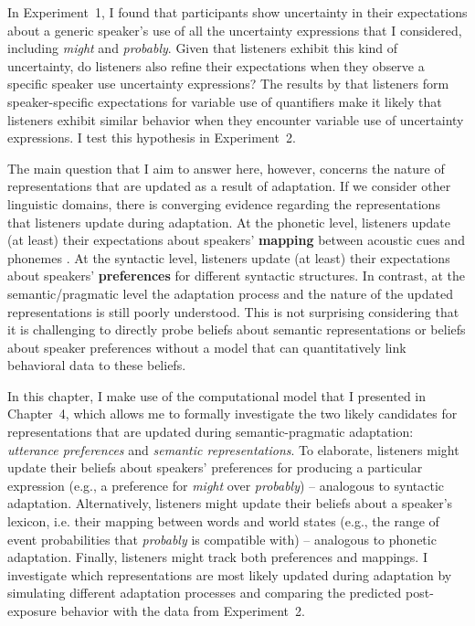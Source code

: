 In Experiment~1, I found that participants show uncertainty in their expectations about a generic speaker's 
use of all the uncertainty expressions that I considered, including \textit{might} and \textit{probably}. Given that
listeners exhibit this kind of uncertainty, do listeners also refine their expectations when they observe a specific speaker
use uncertainty expressions? The results by \textcite{Yildirim2016} that listeners form speaker-specific expectations
for variable use of quantifiers make it likely that listeners exhibit similar behavior when they encounter variable use of uncertainty
expressions. I test this hypothesis in Experiment~2. 

The main question that I aim to answer here, however, concerns the nature of representations that are updated
as a result of adaptation. If we consider other linguistic domains, there is converging evidence regarding the representations that listeners update during adaptation. At the phonetic level, 
listeners update (at least) their expectations about speakers' \textbf{mapping} between acoustic cues and phonemes \parencite[e.g.,][]{Kleinschmidt2015}.
At the syntactic level, listeners update (at least) their expectations about speakers' \textbf{preferences} 
for different syntactic structures. In contrast, at the semantic/pragmatic level the adaptation process and the 
nature of the updated representations is still poorly understood. This is not surprising considering that it is challenging
to directly probe beliefs about semantic representations or beliefs about speaker preferences without 
a model that can quantitatively link behavioral data to these beliefs. 

In this chapter, I make use of the computational model that I presented in Chapter~4, which allows me to formally investigate the two likely candidates for representations that are updated during semantic-pragmatic adaptation: \emph{utterance preferences} and \emph{semantic representations}. To elaborate,  
listeners might update their beliefs about speakers' preferences
for producing a particular expression (e.g., a preference for \emph{might} over \emph{probably}) -- analogous to syntactic adaptation. Alternatively, listeners might update their beliefs about a speaker's lexicon, i.e. their mapping between 
words and world states (e.g., the range of event probabilities that \emph{probably} is compatible with) -- analogous to phonetic adaptation. Finally, listeners might track both preferences and mappings. I investigate which representations are most likely updated during adaptation by simulating different adaptation processes and comparing the predicted post-exposure behavior
with the data from Experiment~2.

